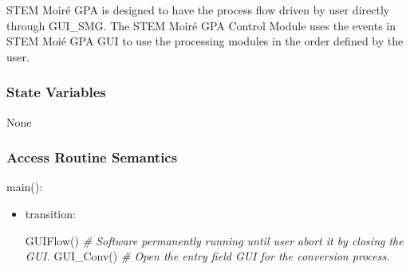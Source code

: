 \documentclass[12pt, titlepage]{article}
\newcommand{\progname}{STEM Moir{\'e} GPA}
\begin{document}
\progname{} is designed to have the process flow driven by user directly through 
GUI{\_}SMG. The STEM Moir{\'e} GPA Control Module uses the events in STEM 
Moi{\'e} GPA GUI to use the processing modules in the order defined by the user.

\subsubsection{State Variables}

None

\subsubsection{Access Routine Semantics}

\noindent main():
\begin{itemize}
\item transition:

GUIFlow()
\noindent\textit{{\#} Software permanently running until user abort it by 
closing the GUI.} \medskip
GUI{\_}Conv()
\noindent\textit{{\#} Open the entry field GUI for the conversion process.} 
\medskip


\end{itemize}
\end{document}
